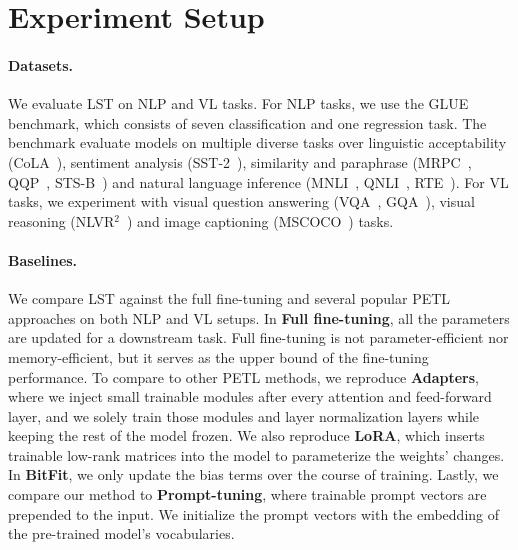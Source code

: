 \section{Experiment Setup}
\label{sec: experiment setup}

\paragraph{Datasets.} 
We evaluate LST on NLP and VL tasks. For NLP tasks, we use the GLUE \cite{wang2018glue} benchmark, which consists of seven classification and one regression task. The benchmark evaluate models on multiple diverse tasks over linguistic acceptability (CoLA~\cite{warstadt2018neural}), sentiment analysis (SST-2~\cite{socher-etal-2013-recursive}), similarity and paraphrase (MRPC~\cite{dolan2005automatically}, QQP~\cite{iyer2017qqp}, STS-B~\cite{cer2017semeval}) and natural language inference (MNLI~\cite{williams2017broad}, QNLI~\cite{rajpurkar2016squad}, RTE~\cite{Bentivogli09thefifth}). For VL tasks, we experiment with visual question answering (VQA~\cite{Goyal2017MakingTV}, GQA~\cite{hudson2019gqa}), visual reasoning (NLVR$^{2}$~\cite{Suhr2019ACF}) and image captioning (MSCOCO~\cite{chen2015MicrosoftCC}) tasks.

\paragraph{Baselines.}

We compare LST against the full fine-tuning and several popular PETL approaches on both NLP and VL setups. In \textbf{Full fine-tuning}, all the parameters are updated for a downstream task. Full fine-tuning is not parameter-efficient nor memory-efficient, but it serves as the upper bound of the fine-tuning performance. To compare to other PETL methods, we reproduce \textbf{Adapters}, where we inject small trainable modules after every attention and feed-forward layer, and we solely train those modules and layer normalization layers while keeping the rest of the model frozen. We also reproduce \textbf{LoRA}, which inserts trainable low-rank matrices into the model to parameterize the weights' changes. In \textbf{BitFit}, we only update the bias terms over the course of training. Lastly, we compare our method to \textbf{Prompt-tuning}, where trainable prompt vectors are prepended to the input. We initialize the prompt vectors with the embedding of the pre-trained model's vocabularies.

